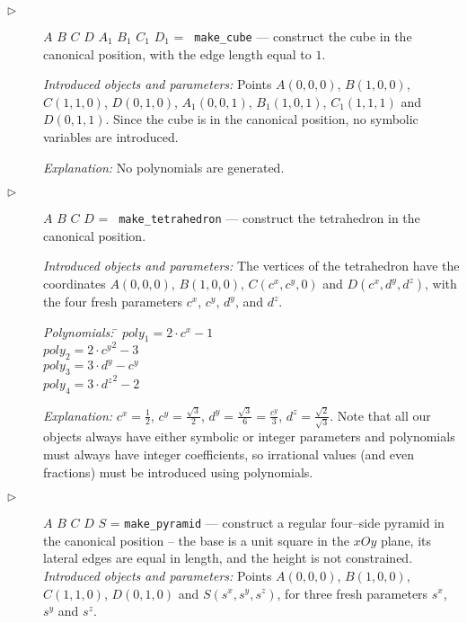 \documentclass{article}
\begin{document}
\begin{description}
\item[$\triangleright$] $A$ $B$ $C$ $D$ $A_1$ $B_1$ $C_1$ $D_1$ = {\tt
    make\_cube} --- construct the cube in the canonical position, with
  the edge length equal to $1$.

  {\em Introduced objects and parameters:} Points $A(0, 0, 0)$,
  $B(1, 0, 0)$, $C(1, 1, 0)$, $D(0, 1, 0)$, $A_1(0, 0, 1)$,
  $B_1(1, 0, 1)$, $C_1(1, 1, 1)$ and $D(0, 1, 1)$. Since the cube is
  in the canonical position, no symbolic variables are introduced.

  {\em Explanation:} No polynomials are generated.

\item[$\triangleright$] $A$ $B$ $C$ $D$ = {\tt
    make\_tetrahedron} \label{tetrahedron} --- construct the
  tetrahedron in the
  canonical position.

  {\em Introduced objects and parameters:} The vertices of the
  tetrahedron have the coordinates $A(0, 0, 0)$, $B(1, 0, 0)$,
  $C(c^x, c^y, 0)$ and $D(c^x, d^y, d^z)$, with the four fresh
  parameters $c^x$, $c^y$, $d^y$, and $d^z$.

\begin{tabbing}
{\em Polynomials:} \= $poly_1 = 2\cdot c^x - 1$ \\
                   \> $poly_2 = 2\cdot {c^y}^2 - 3$ \\
                   \> $poly_3 = 3\cdot d^y - c^y$ \\
                   \> $poly_4 = 3\cdot {d^z}^2 - 2$
\end{tabbing}

{\em Explanation:} $c^x = \frac{1}{2}$, $c^y = \frac{\sqrt{3}}{2}$,
$d^y = \frac{\sqrt{3}}{6} = \frac{c^y}{3}$,
$d^z = \frac{\sqrt{2}}{\sqrt{3}}$. Note that all our objects always
have either symbolic or integer parameters and polynomials must always
have integer coefficients, so irrational values (and even fractions)
must be introduced using polynomials.

\item[$\triangleright$] $A$ $B$ $C$ $D$ $S$ = {\tt make\_pyramid} ---
   construct a regular four--side pyramid in the canonical position --
   the base is a unit square in the $xOy$ plane, its lateral edges are
   equal in length, and the height is not constrained.
   {\em Introduced objects and parameters:} Points $A(0, 0, 0)$,
   $B(1, 0, 0)$, $C(1, 1, 0)$, $D(0, 1, 0)$ and $S(s^x, s^y, s^z)$, for
   three fresh parameters $s^x$, $s^y$ and $s^z$.


\end{description}
\end{document}
